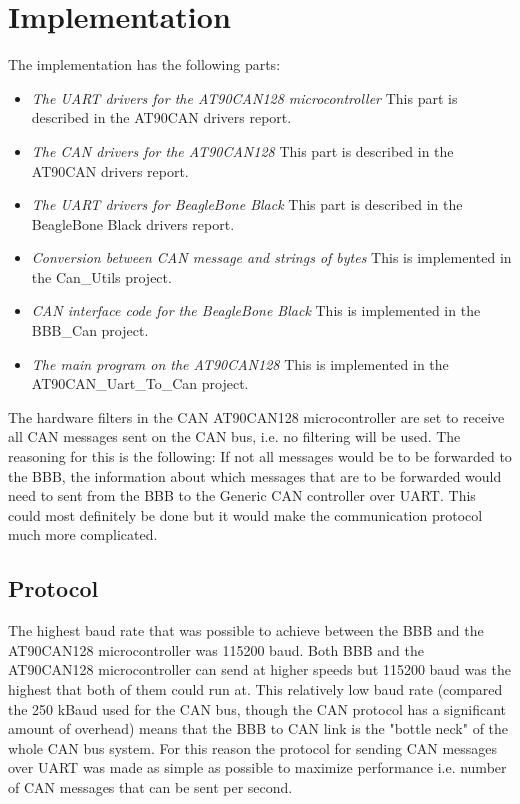 
\section{Implementation}\label{sec:implementation}
The implementation has the following parts:

\begin{itemize}
   \item { \em The UART drivers for the AT90CAN128 microcontroller} \newline This part is described in the AT90CAN drivers report.
   \item { \em The CAN drivers for the AT90CAN128} \newline This part is described in the AT90CAN drivers report.
   \item { \em The UART drivers for BeagleBone Black} \newline This part is described in the BeagleBone Black drivers report.
   \item { \em Conversion between CAN message and strings of bytes } \newline This is implemented in the Can\_Utils project.
   \item { \em CAN interface code for the BeagleBone Black} \newline This is implemented in the BBB\_Can project.
   \item { \em The main program on the AT90CAN128} \newline This is implemented in the AT90CAN\_Uart\_To\_Can project.
\end{itemize}

The hardware filters in the CAN AT90CAN128 microcontroller are set to receive all CAN messages sent on the CAN bus, i.e. no filtering will be used. The reasoning for this is the following: 
If not all messages would be to be forwarded to the BBB, the information about which messages that are to be forwarded would need to sent from the BBB to the Generic CAN controller over UART. This could most definitely be done but it would make the communication protocol much more complicated.

\subsection{Protocol}
The highest baud rate that was possible to achieve between the BBB and the AT90CAN128 microcontroller was 115200 baud. Both BBB and the AT90CAN128 microcontroller can send at higher speeds but 115200 baud was the highest that both of them could run at. This relatively low baud rate (compared the 250 kBaud used for the CAN bus, though the CAN protocol has a significant amount of overhead) means that the BBB to CAN link is the "bottle neck" of the whole CAN bus system. For this reason the protocol for sending CAN messages over UART was made as simple as possible to maximize performance i.e. number of CAN messages that can be sent per second.

